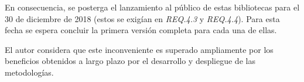 En consecuencia, se posterga el lanzamiento al público de estas bibliotecas para el 30 de diciembre de 2018 (estos se exigían en \emph{REQ.4.3} y \emph{REQ.4.4}). Para esta fecha se espera concluir la primera versión completa para cada una de ellas.

El autor considera que este inconveniente es superado ampliamente por los beneficios obtenidos a largo plazo por el desarrollo y despliegue de las metodologías.







%









